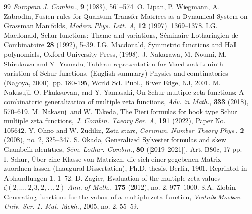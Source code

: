 \documentclass[12pt]{amsart}%
\theoremstyle{definition}
\begin{document}
\begin{thebibliography}{99}
{\it European J. Combin.}, {\bf 9} (1988), 561--574.
O. Lipan, P. Wiegmann, A. Zabrodin, 
Fusion rules for Quantum Transfer Matrices as a Dynamical System on Grassman Manifolds,
{\it Modern Phys. Lett. A}, {\bf 12} (1997), 1369--1378.
I.G. Macdonald, 
Schur functions: Theme and variations,
S\'{e}minaire Lotharingien de Combinatoire {\bf 28} (1992), 5--39.
I.G. Macdonald, 
Symmetric functions and Hall polynomials,
Oxford University Press, (1998).
J. Nakagawa, M. Noumi, M. Shirakawa and Y. Yamada, 
Tableau representation for Macdonald's ninth variation of Schur functions, 
(English summary) Physics and combinatorics (Nagoya, 2000), pp. 180-195, World Sci. Publ., River Edge, NJ, 2001.
M. Nakasuji, O. Phuksuwan, and Y. Yamasaki, 
On Schur multiple zeta functions: A combinatoric generalization of multiple zeta functions, 
{\it Adv. in Math.}, {\bf 333} (2018), 570--619.
M. Nakasuji and W. Takeda,
The Pieri formulas for hook type Schur multiple zeta functions, 
{\it J. Combin. Theory Ser. A}, {\bf 191} (2022), Paper No. 105642.
Y. Ohno and W. Zudilin,
Zeta stars, 
{\it Commun. Number Theory Phys.}, {\bf 2} (2008), no. 2, 325--347.
S. Okada, 
Generalized Sylvester formulas and skew Giambelli identities,
{\it S\'em. Lothar. Combin.}, {\bf 80} ([2019--2021]), Art. B80e, 17 pp.
I. Schur, 
\" Uber eine Klasse von Matrizen, die sich einer gegebenen Matrix zuordnen lassen (Inaugural-Dissertation), 
Ph.D. thesis, Berlin, 1901. Reprinted in Abhandlungen {\bf 1}, 1--72. 
D. Zagier, 
Evaluation of the multiple zeta values $\zeta(2,\ldots,2,3,2,\ldots,2)$ 
{\it Ann. of Math.}, {\bf 175} (2012), no. 2, 977–1000.
S.A. Zlobin, 
Generating functions for the values of a multiple zeta function,
{\it Vestnik Moskov. Univ. Ser. 1. Mat. Mekh.},
2005, no. 2, 55--59.
\end{thebibliography}
\end{document}
